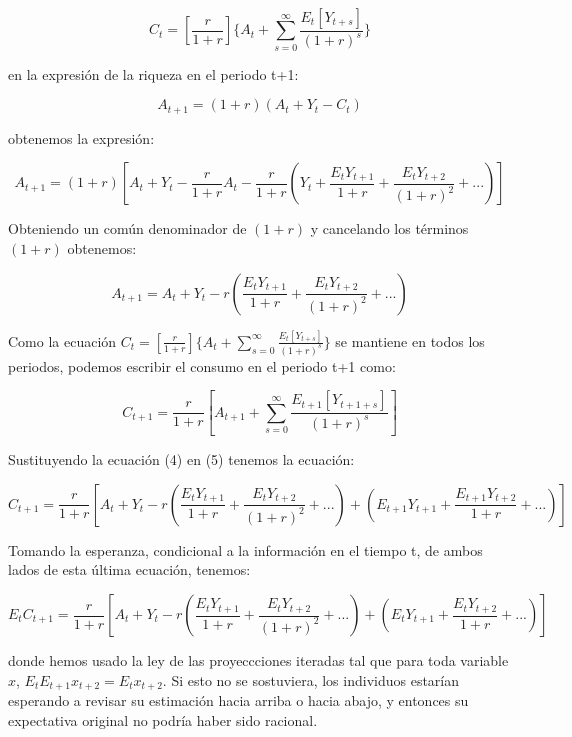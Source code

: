 \documentclass[
]{article}
\begin{document}
\setcounter{equation}{0}

\begin{equation}
C_t=[\frac{r}{1+r}]\{A_t+\sum^\infty_{s=0}\frac{E_t[Y_{t+s}]}{(1+r)^s}\}
\end{equation}

en la expresión de la riqueza en el periodo t+1:

\begin{equation}
A_{t+1}=(1+r)(A_t+Y_t-C_t)
\end{equation}

obtenemos la expresión:

\begin{equation}
A_{t+1}=(1+r)[A_t+Y_t-\frac{r}{1+r}A_t-\frac{r}{1+r}(Y_t+\frac{E_tY_{t+1}}{1+r}+\frac{E_tY_{t+2}}{(1+r)^2}+...)]
\end{equation}

Obteniendo un común denominador de \((1+r)\) y cancelando los términos
\((1+r)\) obtenemos:

\begin{equation}
A_{t+1}=A_t+Y_t-r(\frac{E_tY_{t+1}}{1+r}+\frac{E_tY_{t+2}}{(1+r)^2}+...)
\end{equation}

Como la ecuación
\(C_t=[\frac{r}{1+r}]\{A_t+\sum^\infty_{s=0}\frac{E_t[Y_{t+s}]}{(1+r)^s}\}\)
se mantiene en todos los periodos, podemos escribir el consumo en el
periodo t+1 como:

\begin{equation}
C_{t+1}=\frac{r}{1+r}[A_{t+1}+\sum^\infty_{s=0}\frac{E_{t+1}[Y_{t+1+s}]}{(1+r)^s}]
\end{equation}

Sustituyendo la ecuación (4) en (5) tenemos la ecuación:

\begin{equation}
C_{t+1}=\frac{r}{1+r}[A_t+Y_t-r(\frac{E_tY_{t+1}}{1+r}+\frac{E_tY_{t+2}}{(1+r)^2}+...)+(E_{t+1}Y_{t+1}+\frac{E_{t+1}Y_{t+2}}{1+r}+...)]
\end{equation}

Tomando la esperanza, condicional a la información en el tiempo t, de
ambos lados de esta última ecuación, tenemos:

\begin{equation}
E_tC_{t+1}=\frac{r}{1+r}[A_t+Y_t-r(\frac{E_tY_{t+1}}{1+r}+\frac{E_tY_{t+2}}{(1+r)^2}+...)+(E_{t}Y_{t+1}+\frac{E_{t}Y_{t+2}}{1+r}+...)]
\end{equation}

donde hemos usado la ley de las proyeccciones iteradas tal que para toda
variable \(x\), \(E_tE_{t+1}x_{t+2}=E_tx_{t+2}\). Si esto no se
sostuviera, los individuos estarían esperando a revisar su estimación
hacia arriba o hacia abajo, y entonces su expectativa original no podría
haber sido racional.
\end{document}

